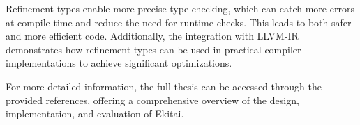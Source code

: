 \documentclass[12pt]{article}
\begin{document}
Refinement types enable more precise type checking, which can catch more errors at compile time and reduce the need for runtime checks. This leads to both safer and more efficient code. Additionally, the integration with LLVM-IR demonstrates how refinement types can be used in practical compiler implementations to achieve significant optimizations.

For more detailed information, the full thesis can be accessed through the provided references, offering a comprehensive overview of the design, implementation, and evaluation of Ekitai.




\end{document}
